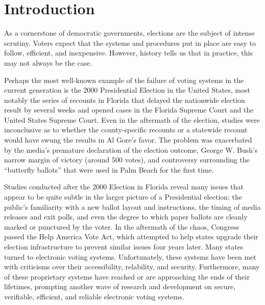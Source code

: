 \chapter{Introduction}\label{ch1}

As a cornerstone of democratic governments, elections are the subject of intense scrutiny. Voters expect that the systems and procedures put in place are easy to follow, efficient, and inexpensive. However, history tells us that in practice, this may not always be the case.

Perhaps the most well-known example of the failure of voting systems in the current generation is the 2000 Presidential Election in the United States, most notably the series of recounts in Florida that delayed the nationwide election result by several weeks and opened cases in the Florida Supreme Court and the United States Supreme Court. Even in the aftermath of the election, studies were inconclusive as to whether the county-specific recounts or a statewide recount would have swung the results in Al Gore's favor. The problem was exacerbated by the media's premature declaration of the election outcome, George W. Bush's narrow margin of victory (around 500 votes), and controversy surrounding the ``butterfly ballots'' that were used in Palm Beach for the first time.

Studies conducted after the 2000 Election in Florida reveal many issues that appear to be quite subtle in the larger picture of a Presidential election: the public's familiarity with a new ballot layout and instructions, the timing of media releases and exit polls, and even the degree to which paper ballots are cleanly marked or punctured by the voter. In the aftermath of the chaos, Congress passed the Help America Vote Act, which attempted to help states upgrade their election infrastructure to prevent similar issues four years later. Many states turned to electronic voting systems. Unfortunately, these systems have been met with criticisms over their accessibility, relability, and security. Furthermore, many of these proprietary systems have reached or are approaching the ends of their lifetimes, prompting another wave of research and development on secure, verifiable, efficient, and reliable electronic voting systems.

